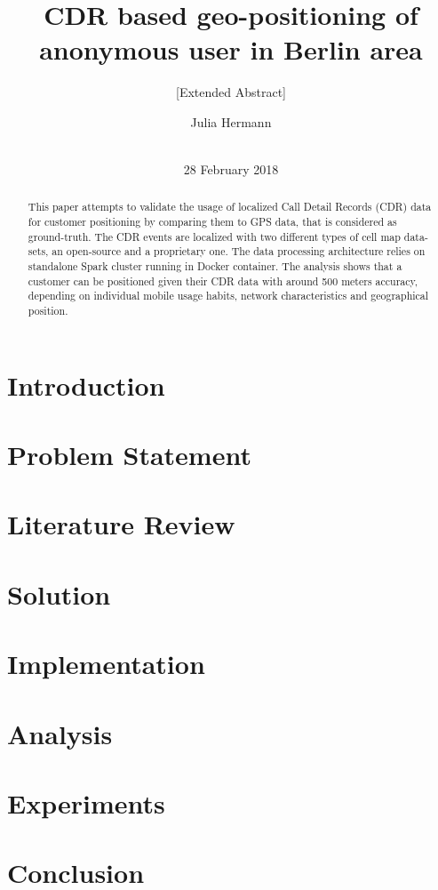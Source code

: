 \documentclass{sig-alternate-05-2015}
\begin{document}
\title{CDR based geo-positioning of anonymous user in Berlin area}
\subtitle{[Extended Abstract]}

\author{
\alignauthor
Julia Hermann\\
       \\
}

\maketitle
\date{28 February 2018}
\begin{abstract}
This paper attempts to validate the usage of localized Call Detail Records (CDR) data for customer positioning by comparing them to GPS data, that is considered as ground-truth. The CDR events are localized with two different types of cell map data-sets, an open-source and a proprietary one. The data processing architecture relies on standalone Spark cluster running in Docker container. The analysis shows that a customer can be positioned given their CDR data with around 500 meters accuracy, depending on individual mobile usage habits, network characteristics and geographical position.

\end{abstract}
\section{Introduction}
\section{Problem Statement}
\section{Literature Review}
\section{Solution}
\section{Implementation}
\section{Analysis}
\section{Experiments}
\section{Conclusion}


\end{document}

